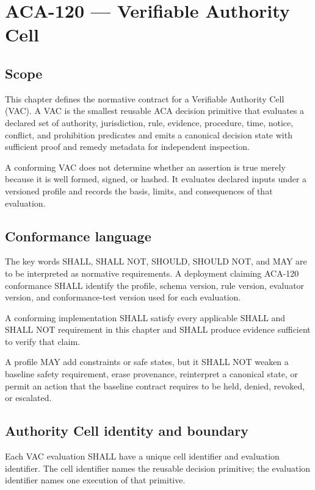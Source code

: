 \chapter{ACA-120 --- Verifiable Authority Cell}

\section{Scope}
This chapter defines the normative contract for a Verifiable Authority Cell
(VAC). A VAC is the smallest reusable ACA decision primitive that evaluates a
declared set of authority, jurisdiction, rule, evidence, procedure, time,
notice, conflict, and prohibition predicates and emits a canonical decision
state with sufficient proof and remedy metadata for independent inspection.

A conforming VAC does not determine whether an assertion is true merely because
it is well formed, signed, or hashed. It evaluates declared inputs under a
versioned profile and records the basis, limits, and consequences of that
evaluation.

\section{Conformance language}
The key words SHALL, SHALL NOT, SHOULD, SHOULD NOT, and MAY are to be
interpreted as normative requirements. A deployment claiming ACA-120
conformance SHALL identify the profile, schema version, rule version,
evaluator version, and conformance-test version used for each evaluation.

\begin{requirement}[ACA-120-001]
A conforming implementation SHALL satisfy every applicable SHALL and SHALL NOT
requirement in this chapter and SHALL produce evidence sufficient to verify that
claim.
\end{requirement}

\begin{requirement}[ACA-120-002]
A profile MAY add constraints or safe states, but it SHALL NOT weaken a baseline
safety requirement, erase provenance, reinterpret a canonical state, or permit
an action that the baseline contract requires to be held, denied, revoked, or
escalated.
\end{requirement}

\section{Authority Cell identity and boundary}
Each VAC evaluation SHALL have a unique cell identifier and evaluation
identifier. The cell identifier names the reusable decision primitive; the
evaluation identifier names one execution of that primitive.

